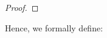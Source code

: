 \documentclass[reqno,a4paper,oneside]{amsart}
\theoremstyle{plain}
\theoremstyle{remark}
\theoremstyle{definition}
\begin{document}
\begin{proof}
%
\end{proof}

Hence, we formally define:
\end{document}
